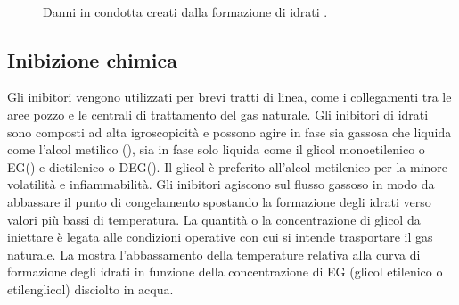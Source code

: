 \begin{figure}[htbp]
    \centering
     \qquad
     \\
\caption{Danni in condotta creati dalla formazione di idrati \parencite{borghi2005idrati}.}
\label{fig:idrati}
\end{figure}

\subsection{Inibizione chimica}
Gli inibitori vengono utilizzati per brevi tratti di linea, come i collegamenti tra le aree pozzo e le centrali di trattamento del gas naturale. Gli inibitori di idrati sono composti ad alta igroscopicità e possono agire in fase sia gassosa che liquida come l'alcol metilico (), sia in fase solo liquida come il glicol monoetilenico o EG() e dietilenico o DEG(). Il glicol è preferito all'alcol metilenico per la minore volatilità e infiammabilità.
Gli inibitori agiscono sul flusso gassoso in modo da abbassare il punto di congelamento spostando la formazione degli idrati verso valori più bassi di temperatura. La quantità o la concentrazione di glicol da iniettare è legata alle condizioni operative con cui si intende trasportare il gas naturale. La  mostra l'abbassamento della temperature relativa alla curva di formazione degli idrati in funzione della concentrazione di EG (glicol etilenico o etilenglicol) disciolto in acqua.

